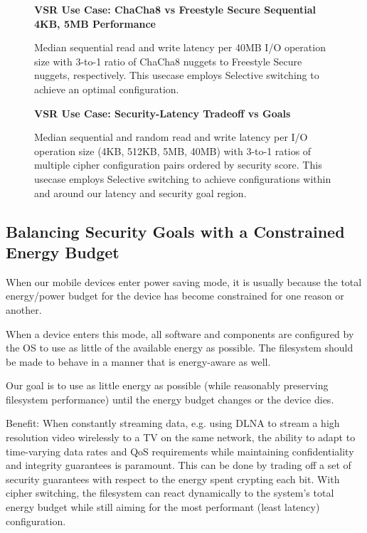 \begin{figure}[ht] \textbf{VSR Use Case: ChaCha8 vs Freestyle Secure Sequential
4KB, 5MB Performance}\par\medskip
   \centering
   {} \caption{Median sequential read and
   write latency per 40MB I/O operation size with 3-to-1 ratio of ChaCha8
   nuggets to Freestyle Secure nuggets, respectively. This usecase employs
   Selective switching to achieve an optimal configuration.}
  \label{fig:usecase-vsr-bar}
\end{figure}

\begin{figure}[ht] \textbf{VSR Use Case: Security-Latency Tradeoff vs
   Goals}\par\medskip
   \centering
   {} \caption{Median sequential and
   random read and write latency per I/O operation size (4KB, 512KB, 5MB, 40MB)
   with 3-to-1 ratios of multiple cipher configuration pairs ordered by security
   score. This usecase employs Selective switching to achieve configurations
   within and around our latency and security goal region.}
  \label{fig:usecase-vsr-tradeoff}
\end{figure}

\subsection{Balancing Security Goals with a Constrained Energy Budget}

When our mobile devices enter power saving mode, it is usually because the total
energy/power budget for the device has become constrained for one reason or
another.

When a device enters this mode, all software and components are configured by
the OS to use as little of the available energy as possible. The filesystem
should be made to behave in a manner that is energy-aware as well.

Our goal is to use as little energy as possible (while reasonably preserving
filesystem performance) until the energy budget changes or the device dies.

Benefit: When constantly streaming data, e.g. using DLNA to stream a high
resolution video wirelessly to a TV on the same network, the ability to adapt to
time-varying data rates and QoS requirements while maintaining confidentiality
and integrity guarantees is paramount. This can be done by trading off a set of
security guarantees with respect to the energy spent crypting each bit. With
cipher switching, the filesystem can react dynamically to the system's total
energy budget while still aiming for the most performant (least latency)
configuration.

